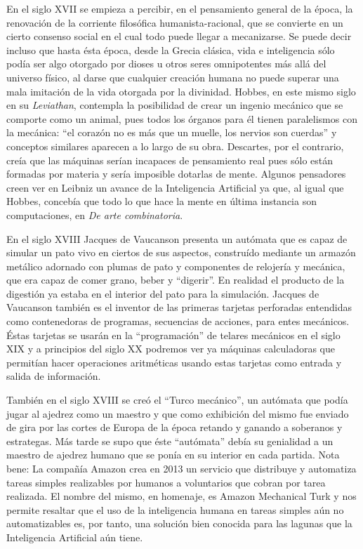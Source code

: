\documentclass[12pt]{memoir}
\begin{document}
En el siglo XVII se empieza a percibir, en el pensamiento general de la época, la renovación de la corriente filosófica humanista-racional, que se convierte en un cierto consenso social en el cual todo puede llegar a mecanizarse. Se puede decir incluso que hasta ésta época, desde la Grecia clásica, vida e inteligencia sólo podía ser algo otorgado por dioses u otros seres omnipotentes más allá del universo físico, al darse que cualquier creación humana no puede superar una mala imitación de la vida otorgada por la divinidad. Hobbes, en este mismo siglo en su \textit{Leviathan}, contempla la posibilidad de crear un ingenio mecánico que se comporte como un animal, pues todos los órganos para él tienen paralelismos con la mecánica: ``el corazón no es más que un muelle, los nervios son cuerdas'' y conceptos similares aparecen a lo largo de su obra. Descartes, por el contrario, creía que las máquinas serían incapaces de pensamiento real pues sólo están formadas por materia y sería imposible dotarlas de mente. Algunos pensadores creen ver en Leibniz un avance de la Inteligencia Artificial ya que, al igual que Hobbes, concebía que todo lo que hace la mente en última instancia son computaciones, en \textit{De arte combinatoria}. 

En el siglo XVIII Jacques de Vaucanson presenta un autómata que es capaz de simular un pato vivo en ciertos de sus aspectos, construído mediante un armazón metálico adornado con plumas de pato y componentes de relojería y mecánica, que era capaz de comer grano, beber y ``digerir''. En realidad el producto de la digestión ya estaba en el interior del pato para la simulación. Jacques de Vaucanson también es el inventor de las primeras tarjetas perforadas entendidas como contenedoras de programas, secuencias de acciones, para entes mecánicos. Éstas tarjetas se usarán en la ``programación'' de telares mecánicos en el siglo XIX y a principios del siglo XX podremos ver ya máquinas calculadoras que permitían hacer operaciones aritméticas usando estas tarjetas como entrada y salida de información.

También en el siglo XVIII se creó el ``Turco mecánico'', un autómata que podía jugar al ajedrez como un maestro y que como exhibición del mismo fue enviado de gira por las cortes de Europa de la época retando y ganando a soberanos y estrategas. Más tarde se supo que éste ``autómata'' debía su genialidad a un maestro de ajedrez humano que se ponía en su interior en cada partida. Nota bene: La compañía Amazon crea en 2013 un servicio que distribuye y automatiza tareas simples realizables por humanos a voluntarios que cobran por tarea realizada. El nombre del mismo, en homenaje, es Amazon Mechanical Turk y nos permite resaltar que el uso de la inteligencia humana en tareas simples aún no automatizables es, por tanto, una solución bien conocida para las lagunas que la Inteligencia Artificial aún tiene. 
\end{document}
